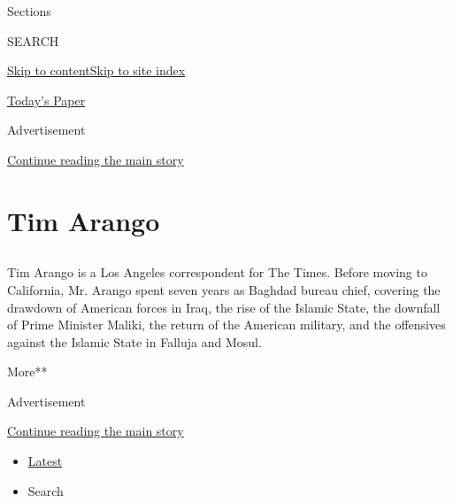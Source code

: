 Sections

SEARCH

\protect\hyperlink{site-content}{Skip to
content}\protect\hyperlink{site-index}{Skip to site index}

\href{https://myaccount.nytimes3xbfgragh.onion/auth/login?response_type=cookie\&client_id=vi}{}

\href{https://www.nytimes3xbfgragh.onion/section/todayspaper}{Today's
Paper}

Advertisement

\protect\hyperlink{after-top}{Continue reading the main story}

\hypertarget{tim-arango}{%
\section{Tim Arango}\label{tim-arango}}

\subsection{}

Tim Arango is a Los Angeles correspondent for The Times. Before moving
to California, Mr. Arango spent seven years as Baghdad bureau chief,
covering the drawdown of American forces in Iraq, the rise of the
Islamic State, the downfall of Prime Minister Maliki, the return of the
American military, and the offensives against the Islamic State in
Falluja and Mosul.

More**

Advertisement

\protect\hyperlink{after-mid1}{Continue reading the main story}

\begin{itemize}
\tightlist
\item
  \protect\hyperlink{stream-panel}{Latest}
\item
  Search
\end{itemize}

